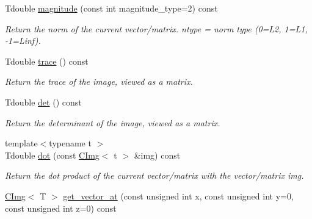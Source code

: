  \begin{DoxyCompactItemize}
\item 
\hypertarget{structcimg__library_1_1CImg_aef6d631b6ec107b9e079e0c523849838}{
Tdouble \hyperlink{structcimg__library_1_1CImg_aef6d631b6ec107b9e079e0c523849838}{magnitude} (const int magnitude\_\-type=2) const }
\label{structcimg__library_1_1CImg_aef6d631b6ec107b9e079e0c523849838}

\begin{DoxyCompactList}\small\item\em Return the norm of the current vector/matrix. {\ttfamily ntype} = norm type (0=L2, 1=L1, -\/1=Linf). \item\end{DoxyCompactList}\item 
\hypertarget{structcimg__library_1_1CImg_ad53c6988fc684fe8b3cc5aa8ce2fd755}{
Tdouble \hyperlink{structcimg__library_1_1CImg_ad53c6988fc684fe8b3cc5aa8ce2fd755}{trace} () const }
\label{structcimg__library_1_1CImg_ad53c6988fc684fe8b3cc5aa8ce2fd755}

\begin{DoxyCompactList}\small\item\em Return the trace of the image, viewed as a matrix. \item\end{DoxyCompactList}\item 
\hypertarget{structcimg__library_1_1CImg_a85c2cce2cceed015703980b0f56b2321}{
Tdouble \hyperlink{structcimg__library_1_1CImg_a85c2cce2cceed015703980b0f56b2321}{det} () const }
\label{structcimg__library_1_1CImg_a85c2cce2cceed015703980b0f56b2321}

\begin{DoxyCompactList}\small\item\em Return the determinant of the image, viewed as a matrix. \item\end{DoxyCompactList}\item 
\hypertarget{structcimg__library_1_1CImg_a4952ca513e39b1ca15e860cc06751b28}{
{\footnotesize template$<$typename t $>$ }\\Tdouble \hyperlink{structcimg__library_1_1CImg_a4952ca513e39b1ca15e860cc06751b28}{dot} (const \hyperlink{structcimg__library_1_1CImg}{CImg}$<$ t $>$ \&img) const }
\label{structcimg__library_1_1CImg_a4952ca513e39b1ca15e860cc06751b28}

\begin{DoxyCompactList}\small\item\em Return the dot product of the current vector/matrix with the vector/matrix {\ttfamily img}. \item\end{DoxyCompactList}\item 
\hypertarget{structcimg__library_1_1CImg_aac10e7f03cdf50782511200bbcaeaa70}{
\hyperlink{structcimg__library_1_1CImg}{CImg}$<$ T $>$ \hyperlink{structcimg__library_1_1CImg_aac10e7f03cdf50782511200bbcaeaa70}{get\_\-vector\_\-at} (const unsigned int x, const unsigned int y=0, const unsigned int z=0) const }
\label{structcimg__library_1_1CImg_aac10e7f03cdf50782511200bbcaeaa70}


\end{DoxyCompactItemize}
